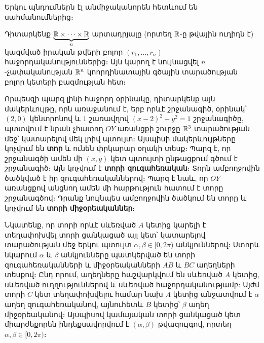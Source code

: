 \documentclass[./main.tex]{subfiles}
\begin{document}
\par Երկու պնդումներն էլ անմիջականորեն հետևում են սահմանումներից։
\begin{example}\label{ch2ex1}
Դիտարկենք $\underbrace{\mathbb{R}\times\dots \times \mathbb{R}}_n$ արտադրյալը (որտեղ $\mathbb{R}$-ը թվային ուղիղն է) կազմված իրական թվերի բոլոր $(r_1,\dots,r_n)$ հաջորդականություններից։ Այն կա\-րող է նույնացվել $n$-չա\-փա\-կա\-նու\-թյան $\mathbb{R}^n$ կոորդինատային գծային տարածության բոլոր կետերի բազմու\-թյան հետ։%
\end{example}
\label{օրինակ 2:1}
\par Որպեսզի պարզ լինի հաջորդ օրինակը, դիտարկենք այն մակերևույթը, որն առա\-ջա\-նում է, երբ որևէ շրջանագիծ, օրինակ՝ $(2,0)$ կենտրոնով և $1$ շառավղով $(x-2)^2+y^2=1$ շրջանագիծը, պտտվում է նրան չհատող $OY$ առանցքի շուրջը $\mathbb{R}^3$ տարածության մեջ՝ կատարելով մեկ լրիվ պտույտ։ Այսպիսի մակերևույթները կոչվում են \textbf{տոր} և ունեն փրկարար օղակի տեսք։ 
Պարզ է, որ շրջանագծի ամեն մի $(x,y)$ կետ պտույտի ընթացքում գծում է շրջանագիծ։ Այն կոչվում է \textbf{տորի զու\-գա\-հե\-ռական}։ Տորն ամբողջովին ծածկված է իր զուգահեռականներով։ Պարզ է նաև, որ $OY$ առանցքով անցնող ամեն մի հարթություն հատում է տորը շրջանագծով։ Դրանք նույնպես ամբողջովին ծածկում են տորը և կոչվում են \textbf{տորի միջօրեականներ}։
\par Նկատենք, որ տորի որևէ սևեռված $A$ կետից կարելի է տեղափոխվել տորի ցանկացած այլ կետ՝ կատարելով տարածության մեջ երկու պտույտ $\alpha, \beta \in [0, 2\pi)$ անկյուններով։ Ստորև նկարում $\alpha$ և $\beta$ անկյուն\-ները պատկերված են տորի զու\-գա\-հե\-ռականների և միջօրեականների $AB$ և $BC$ աղեղների տեսքով։ Ընդ որում, աղեղները հաշվարկվում են սևեռված $A$ կետից, սևեռ\-ված ուղղություններով և սևեռ\-ված հաջորդականությամբ: Այժմ տորի $C$ կետ տեղափոխվելու համար նախ $A$ կետից ան\-ջատ\-վում է $\alpha$ աղեղ զուգահեռականով, այնուհետև $B$ կետից՝ $\beta$ աղեղ միջօրեականով։ Այսպի\-սով կամայական տորի ցանկացած կետ միարժեքորեն ինդեք\-սա\-վորվում է $(\alpha, \beta)$ թվազույգով, որտեղ $\alpha, \beta \in [0, 2\pi)$։
\end{document}
